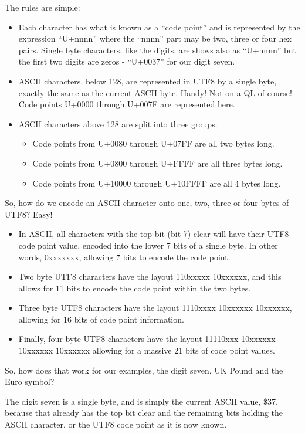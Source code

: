 The rules are simple:
\begin{itemize}
\item Each character has what is known as a ``code point'' and is represented
by the expression ``U+nnnn'' where the ``nnnn'' part may be two,
three or four hex pairs. Single byte characters, like the digits,
are shows also as ``U+nnnn'' but the first two digits are zeros
- ``U+0037'' for our digit seven.
\item ASCII characters, below 128, are represented in UTF8 by a single byte,
exactly the same as the current ASCII byte. Handy! Not on a QL of
course! Code points U+0000 through U+007F are represented here.
\item ASCII characters above 128 are split into three groups. 
\begin{itemize}
\item Code points from U+0080 through U+07FF are all two bytes long.
\item Code points from U+0800 through U+FFFF are all three bytes long.
\item Code points from U+10000 through U+10FFFF are all 4 bytes long.
\end{itemize}
\end{itemize}
So, how do we encode an ASCII character onto one, two, three or four bytes of UTF8? Easy!
\begin{itemize}
\item In ASCII, all characters with the top bit (bit 7) clear will have their UTF8 code point value, encoded into the lower 7 bits of a single byte. In other words, 0xxxxxxx, allowing 7 bits to encode the code point.
\item Two byte UTF8 characters have the layout 110xxxxx 10xxxxxx, and this allows
for 11 bits to encode the code point within the two bytes. 
\item Three byte UTF8 characters have the layout 1110xxxx 10xxxxxx 10xxxxxx,
allowing for 16 bits of code point information.
\item Finally, four byte UTF8 characters have the layout 11110xxx 10xxxxxx 10xxxxxx
10xxxxxx allowing for a massive 21 bits of code point values.
\end{itemize}
So, how does that work for our examples, the digit seven, UK Pound
and the Euro symbol?

The digit seven is a single byte, and is simply the current ASCII
value, \$37, because that already has the top bit clear and the remaining
bits holding the ASCII character, or the UTF8 code point as it is
now known.


